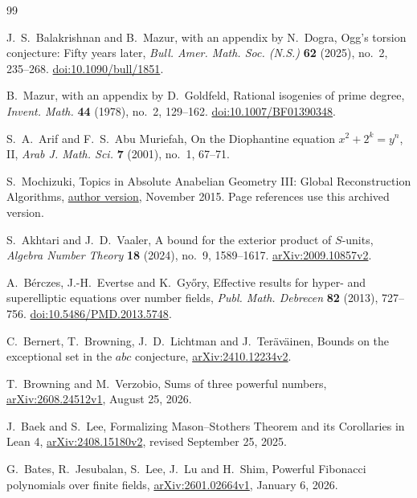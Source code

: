 \documentclass[11pt]{amsart}
\theoremstyle{definition}
\theoremstyle{remark}
\begin{document}
\begin{thebibliography}{99}
\raggedright
\raggedbottom

J.~S.~Balakrishnan and B.~Mazur, with an appendix by N.~Dogra,
Ogg's torsion conjecture: Fifty years later,
\emph{Bull. Amer. Math. Soc. (N.S.)} \textbf{62} (2025), no.~2, 235--268.
\href{https://doi.org/10.1090/bull/1851}{doi:10.1090/bull/1851}.

B.~Mazur, with an appendix by D.~Goldfeld,
Rational isogenies of prime degree,
\emph{Invent. Math.} \textbf{44} (1978), no.~2, 129--162.
\href{https://doi.org/10.1007/BF01390348}{doi:10.1007/BF01390348}.

S.~A.~Arif and F.~S.~Abu Muriefah,
On the Diophantine equation $x^2+2^k=y^n$, II,
\emph{Arab J. Math. Sci.} \textbf{7} (2001), no.~1, 67--71.

S.~Mochizuki, Topics in Absolute Anabelian Geometry III:
Global Reconstruction Algorithms,
\href{https://www.kurims.kyoto-u.ac.jp/~motizuki/Topics%20in%20Absolute%20Anabelian%20Geometry%20III.pdf}{author version}, November 2015.
Page references use this archived version.

S.~Akhtari and J.~D.~Vaaler, A bound for the exterior product of $S$-units,
\emph{Algebra Number Theory} \textbf{18} (2024), no.~9, 1589--1617.
\href{https://arxiv.org/abs/2009.10857v2}{arXiv:2009.10857v2}.

A.~B\'erczes, J.-H.~Evertse and K.~Gy\H{o}ry,
Effective results for hyper- and superelliptic equations over number fields,
\emph{Publ. Math. Debrecen} \textbf{82} (2013), 727--756.
\href{https://doi.org/10.5486/PMD.2013.5748}{doi:10.5486/PMD.2013.5748}.

C.~Bernert, T.~Browning, J.~D.~Lichtman and J.~Ter\"av\"ainen,
Bounds on the exceptional set in the $abc$ conjecture,
\href{https://arxiv.org/abs/2410.12234v2}{arXiv:2410.12234v2}.

T.~Browning and M.~Verzobio,
Sums of three powerful numbers,
\href{https://arxiv.org/abs/2608.24512v1}{arXiv:2608.24512v1},
August 25, 2026.

J.~Baek and S.~Lee,
Formalizing Mason--Stothers Theorem and its Corollaries in Lean 4,
\href{https://arxiv.org/abs/2408.15180v2}{arXiv:2408.15180v2},
revised September 25, 2025.

G.~Bates, R.~Jesubalan, S.~Lee, J.~Lu and H.~Shim,
Powerful Fibonacci polynomials over finite fields,
\href{https://arxiv.org/abs/2601.02664v1}{arXiv:2601.02664v1},
January 6, 2026.


\end{thebibliography}
\end{document}
